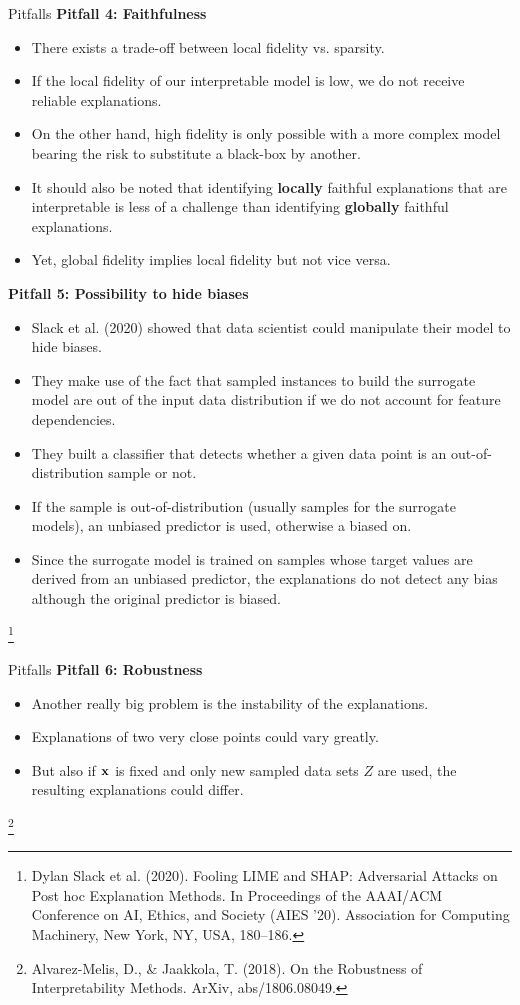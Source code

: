 \documentclass[11pt,compress,t,notes=noshow, xcolor=table]{beamer}
\begin{document}
\begin{vbframe}{Pitfalls}
\textbf{Pitfall 4: Faithfulness}
\begin{itemize}
	\item There exists a trade-off between local fidelity vs. sparsity. 
	\item If the local fidelity of our interpretable model is low, we do not receive reliable explanations.
	\item On the other hand, high fidelity is only possible with a more complex model bearing the risk to substitute a black-box by another.
	\item It should also be noted that identifying \textbf{locally} faithful explanations that are interpretable is less of a challenge than identifying \textbf{globally} faithful explanations. 
	\item Yet, global fidelity implies local fidelity but not vice versa. 
\end{itemize}
\framebreak

\textbf{Pitfall 5: Possibility to hide biases}
\begin{itemize}
	\item Slack et al. (2020) showed that data scientist could manipulate their model to hide biases. 
	\item They make use of the fact that sampled instances to build the surrogate model are out of the input data distribution if we do not account for feature dependencies. 
	\item They built a classifier that detects whether a given data point is an out-of-distribution sample or not. 
	\item If the sample is out-of-distribution (usually samples for the surrogate models), an unbiased predictor is used, otherwise a biased on. 
	\item Since the surrogate model is trained on samples whose target values are derived from an unbiased predictor, the explanations do not detect any bias although the original predictor is biased. 
\end{itemize}
\footnote[frame]{Dylan Slack et al. (2020). Fooling LIME and SHAP: Adversarial Attacks on Post hoc Explanation Methods. In Proceedings of the AAAI/ACM Conference on AI, Ethics, and Society (AIES '20). Association for Computing Machinery, New York, NY, USA, 180–186.}
\end{vbframe}

\begin{vbframe}{Pitfalls}
\textbf{Pitfall 6: Robustness}
\begin{itemize}
	\item Another really big problem is the instability of the explanations. 
	\item Explanations of two very close points could vary greatly. 
	\item But also if $\xv$ is fixed and only new sampled data sets $Z$ are used, the resulting explanations could differ.  
\end{itemize}
\footnote[frame]{Alvarez-Melis, D., \& Jaakkola, T. (2018). On the Robustness of Interpretability Methods. ArXiv, abs/1806.08049.}
\end{vbframe}
\end{document}
